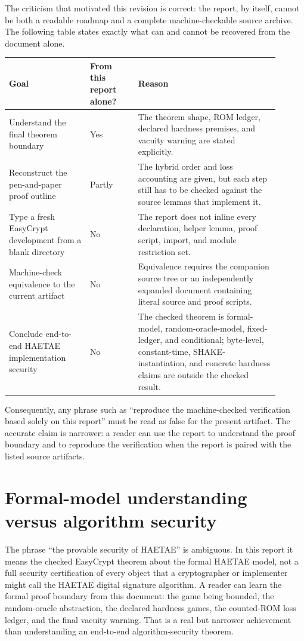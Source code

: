 \documentclass[11pt]{report}
\theoremstyle{definition}
\theoremstyle{plain}
\begin{document}
The criticism that motivated this revision is correct: the report, by itself,
cannot be both a readable roadmap and a complete machine-checkable source
archive.  The following table states exactly what can and cannot be recovered
from the document alone.

\begin{longtable}{p{0.27\linewidth}p{0.16\linewidth}p{0.47\linewidth}}
\toprule
\textbf{Goal} & \textbf{From this report alone?} & \textbf{Reason} \\
\midrule
Understand the final theorem boundary & Yes & The theorem shape, ROM ledger,
declared hardness premises, and vacuity warning are stated explicitly. \\
Reconstruct the pen-and-paper proof outline & Partly & The hybrid order and
loss accounting are given, but each step still has to be checked against the
source lemmas that implement it. \\
Type a fresh EasyCrypt development from a blank directory & No & The report
does not inline every declaration, helper lemma, proof script, import, and
module restriction set. \\
Machine-check equivalence to the current artifact & No & Equivalence requires
the companion source tree or an independently expanded document containing
literal source and proof scripts. \\
Conclude end-to-end HAETAE implementation security & No & The checked theorem
is formal-model, random-oracle-model, fixed-ledger, and conditional; byte-level,
constant-time, SHAKE-instantiation, and concrete hardness claims are outside
the checked result. \\
\bottomrule
\end{longtable}

Consequently, any phrase such as ``reproduce the machine-checked verification
based solely on this report'' must be read as false for the present artifact.
The accurate claim is narrower: a reader can use the report to understand the
proof boundary and to reproduce the verification when the report is paired with
the listed source artifacts.

\section{Formal-model understanding versus algorithm security}

The phrase ``the provable security of HAETAE'' is ambiguous.  In this report it
means the checked EasyCrypt theorem about the formal HAETAE model, not a full
security certification of every object that a cryptographer or implementer
might call the HAETAE digital signature algorithm.  A reader can learn the
formal proof boundary from this document: the game being bounded, the
random-oracle abstraction, the declared hardness games, the counted-ROM loss
ledger, and the final vacuity warning.  That is a real but narrower achievement
than understanding an end-to-end algorithm-security theorem.
\end{document}
